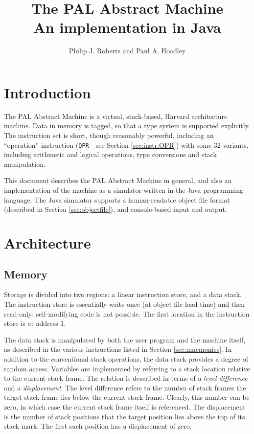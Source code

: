 \documentclass[a4paper,10pt]{report}
\begin{document}
\author{Philip J. Roberts and Paul A. Hoadley}
\title{The PAL Abstract Machine \\ An implementation in Java}
\date{}
\maketitle

\tableofcontents
\listoffigures
\listoftables

\chapter{Introduction}
The PAL Abstract Machine is a virtual, stack-based, Harvard
architecture machine.  Data in memory is tagged, so that a type system
is supported explicitly.  The instruction set is short, though
reasonably powerful, including an ``operation'' instruction
(\texttt{OPR}---see Section \ref{sec:instr:OPR}) with some 32
variants, including arithmetic and logical operations, type
conversions and stack manipulation.

This document describes the PAL Abstract Machine in general, and also
an implementation of the machine as a simulator written in the Java
programming language.  The Java simulator supports a human-readable
object file format (described in Section \ref{sec:objectfile}), and
console-based input and output.

\chapter{Architecture}
\section{Memory}
\label{sec:arch.mem}
Storage is divided into two regions: a linear instruction store, and a
data stack.  The instruction store is essentially write-once (at
object file load time) and then read-only: self-modifying code is not
possible.  The first location in the instruction store is at address
1.

The data stack is manipulated by both the user program and the machine
itself, as described in the various instructions listed in Section
\ref{sec:mnemonics}.  In addition to the conventional stack
operations, the data stack provides a degree of random access.
Variables are implemented by referring to a stack location relative to
the current stack frame.  The relation is described in terms of a
\emph{level difference} and a \emph{displacement}.  The level
difference refers to the number of stack frames the target stack frame
lies below the current stack frame.  Clearly, this number can be zero,
in which case the current stack frame itself is referenced.  The
displacement is the number of stack positions that the target position
lies above the top of its stack mark.  The first such position has a
displacement of zero.
\end{document}
